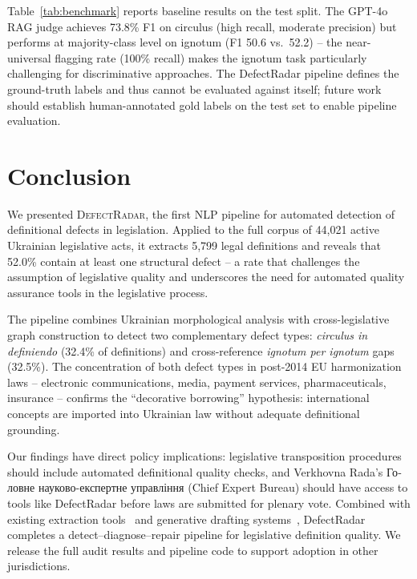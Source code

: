 \documentclass[11pt]{article}
\begin{document}
Table~\ref{tab:benchmark} reports baseline results on the test split.
The GPT-4o RAG judge achieves 73.8\% F1 on circulus (high recall, moderate precision) but performs at majority-class level on ignotum (F1 50.6 vs.\ 52.2) -- the near-universal flagging rate (100\% recall) makes the ignotum task particularly challenging for discriminative approaches.
The DefectRadar pipeline defines the ground-truth labels and thus cannot be evaluated against itself; future work should establish human-annotated gold labels on the test set to enable pipeline evaluation.

\section{Conclusion}
\label{sec:conclusion}

We presented \textsc{DefectRadar}, the first NLP pipeline for automated detection of definitional defects in legislation.
Applied to the full corpus of 44{,}021 active Ukrainian legislative acts, it extracts 5{,}799 legal definitions and reveals that 52.0\% contain at least one structural defect -- a rate that challenges the assumption of legislative quality and underscores the need for automated quality assurance tools in the legislative process.

The pipeline combines Ukrainian morphological analysis with cross-legislative graph construction to detect two complementary defect types: \emph{circulus in definiendo} (32.4\% of definitions) and cross-reference \emph{ignotum per ignotum} gaps (32.5\%).
The concentration of both defect types in post-2014 EU harmonization laws -- electronic communications, media, payment services, pharmaceuticals, insurance -- confirms the ``decorative borrowing'' hypothesis: international concepts are imported into Ukrainian law without adequate definitional grounding.

Our findings have direct policy implications: legislative transposition procedures should include automated definitional quality checks, and Verkhovna Rada's \foreignlanguage{ukrainian}{Головне науково-експертне управління} (Chief Expert Bureau) should have access to tools like DefectRadar before laws are submitted for plenary vote.
Combined with existing extraction tools~\citep{hosabettu2025statutory} and generative drafting systems~\citep{chouhan2024lexdrafter}, DefectRadar completes a detect--diagnose--repair pipeline for legislative definition quality.
We release the full audit results and pipeline code to support adoption in other jurisdictions.
\end{document}
